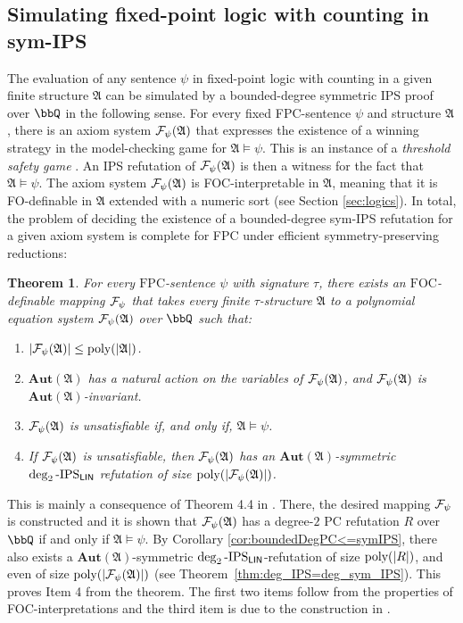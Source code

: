 \documentclass[10pt,a4paper]{article}
\newtheorem{theorem}{Theorem}
\newcommand{\FPC}{\mathrm{FPC}}
\newcommand{\Aut}{\mathbf{Aut}}
\renewcommand{\AA}{{\mathfrak A}}
\newcommand{\Ff}{{\cal F}}
\newcommand{\poly}{\text{\upshape poly}}
\newcommand{\IPSlin}{\text{\upshape IPS}_{\mathsf{LIN}}}
\begin{document}
\subsection{Simulating fixed-point logic with counting in sym-IPS}
The evaluation of any sentence $\psi$ in fixed-point logic with counting in a given finite structure $\AA$ can be simulated by a bounded-degree symmetric IPS proof over $\bbQ$ in the following sense. For every fixed FPC-sentence $\psi$ and structure $\AA$, there is an axiom system $\Ff_\psi(\AA)$ that expresses the existence of a winning strategy in the model-checking game for $\AA \models \psi$. This is an instance of a \emph{threshold safety game} \cite{threshold_games_FPC}.
An IPS refutation of $\Ff_\psi(\AA)$ is then a witness for the fact that $\AA \models \psi$. 
The axiom system $\Ff_\psi(\AA)$ is FOC-interpretable in $\AA$, meaning that it is FO-definable in $\AA$ extended with a numeric sort (see Section \ref{sec:logics}). In total, the problem of deciding the existence of a bounded-degree sym-IPS refutation for a given axiom system is complete for FPC under efficient symmetry-preserving reductions:
\begin{theorem}
	\label{thm:simulateFPCinIPS}
	For every $\FPC$-sentence $\psi$ with signature $\tau$, there exists an $\mathrm{FOC}$-definable mapping $\Ff_\psi$ that takes every finite $\tau$-structure $\AA$ to a polynomial equation system $\Ff_\psi(\AA)$ over $\bbQ$ such that:
	\begin{enumerate}
		\item $|\Ff_\psi(\AA)| \leq \poly(|\AA|)$.
		\item $\Aut(\AA)$ has a natural action on the variables of $\Ff_\psi(\AA)$, and $\Ff_\psi(\AA)$ is $\Aut(\AA)$-invariant. 
		\item $\Ff_\psi(\AA)$ is unsatisfiable if, and only if, $\AA \models \psi$.
		\item If $\Ff_\psi(\AA)$ is unsatisfiable, then $\Ff_\psi(\AA)$ has an $\Aut(\AA)$-symmetric $\deg_2\text{-}\IPSlin$ refutation of size $\poly(|\Ff_\psi(\AA)|)$.
	\end{enumerate}	
\end{theorem}	
This is mainly a consequence of Theorem 4.4 in \cite{ggpp}. There, the desired mapping $\Ff_\psi$ is constructed and it is shown that $\Ff_\psi(\AA)$ has a degree-$2$ PC refutation $R$ over $\bbQ$ if and only if $\AA \models \psi$. 
By Corollary \ref{cor:boundedDegPC<=symIPS}, there also exists a $\Aut(\AA)$-symmetric $\deg_2\text{-}\IPSlin$-refutation of size $\poly(|R|)$, and even of size $\poly(|\Ff_\psi(\AA)|)$ (see Theorem~\ref{thm:deg_IPS=deg_sym_IPS}). This proves Item 4 from the theorem. The first two items follow from the properties of FOC-interpretations and the third item is due to the construction in \cite{ggpp}.
\end{document}
